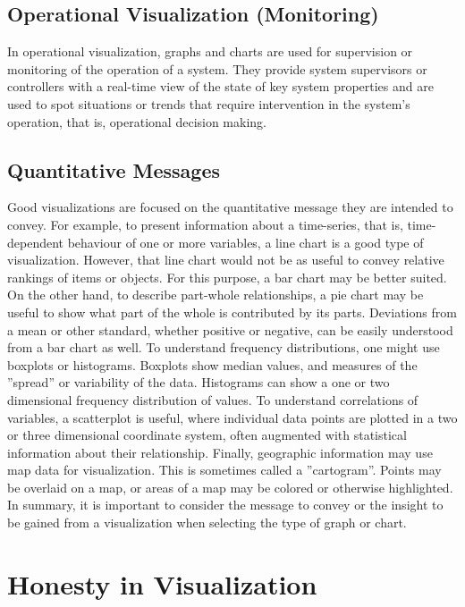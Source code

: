 \subsection*{Operational Visualization (Monitoring)}

In operational visualization, graphs and charts are used for supervision or monitoring of the operation of a system. They provide system supervisors or controllers with a real-time view of the state of key system properties and are used to spot situations or trends that require intervention in the system's operation, that is, operational decision making. 

\subsection*{Quantitative Messages} 

Good visualizations are focused on the quantitative message they are intended to convey. For example, to present information about a time-series, that is, time-dependent behaviour of one or more variables, a line chart is a good type of visualization. However, that line chart would not be as useful to convey relative rankings of items or objects. For this purpose, a bar chart may be better suited. On the other hand, to describe part-whole relationships, a pie chart may be useful to show what part of the whole is contributed by its parts. Deviations from a mean or other standard, whether positive or negative, can be easily understood from a bar chart as well. To understand frequency distributions, one might use boxplots or histograms. Boxplots show median values, and measures of the ''spread'' or variability of the data. Histograms can show a one or two dimensional frequency distribution of values. To understand correlations of variables, a scatterplot is useful, where individual data points are plotted in a two or three dimensional coordinate system, often augmented with statistical information about their relationship. Finally, geographic information may use map data for visualization. This is sometimes called a ''cartogram''. Points may be overlaid on a map, or areas of a map may be colored or otherwise highlighted. In summary, it is important to consider the message to convey or the insight to be gained from a visualization when selecting the type of graph or chart.

\section{Honesty in Visualization}

